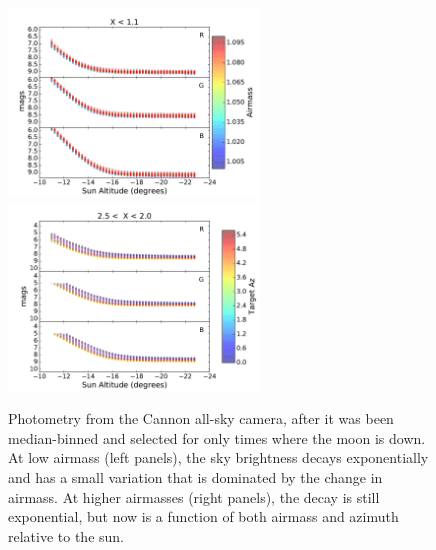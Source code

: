\documentclass[]{spie}
\begin{document}
\begin{figure}
  \includegraphics[height=5cm]{plots/altDecay.pdf}
  \includegraphics[height=5cm]{plots/altDecayHA.pdf}
  \caption{Photometry from the Cannon all-sky camera, after it was been median-binned and selected for only times where the moon is down.  At low airmass (left panels), the sky brightness decays exponentially and has a small variation that is dominated by the change in airmass.  At higher airmasses (right panels), the decay is still exponential, but now is a function of both airmass and azimuth relative to the sun. \label{fig:twiExp}}
\end{figure}
\end{document}
